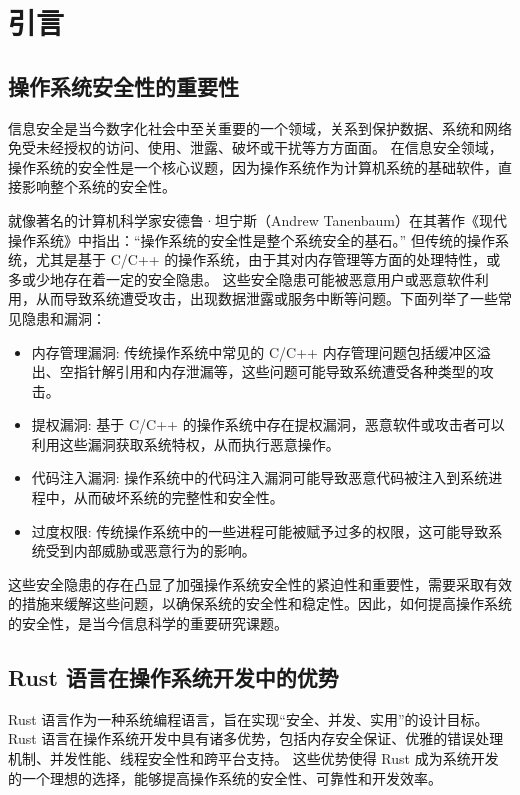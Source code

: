 
\chapter{引言}

\section{操作系统安全性的重要性}
信息安全是当今数字化社会中至关重要的一个领域，关系到保护数据、系统和网络免受未经授权的访问、使用、泄露、破坏或干扰等方方面面。\parencite{anderson2001,stallings2017,schneier2015,bishop2003,ross2014}
在信息安全领域，操作系统的安全性是一个核心议题，因为操作系统作为计算机系统的基础软件，直接影响整个系统的安全性。\parencite{zhang2020enhancing,wang2019survey,patel2018mitigating}

就像著名的计算机科学家安德鲁·坦宁斯（Andrew Tanenbaum）在其著作《现代操作系统》\parencite{tanenbaum2014modern}中指出：“操作系统的安全性是整个系统安全的基石。” 
但传统的操作系统，尤其是基于 C/C++ 的操作系统，由于其对内存管理等方面的处理特性，或多或少地存在着一定的安全隐患。
这些安全隐患可能被恶意用户或恶意软件利用，从而导致系统遭受攻击，出现数据泄露或服务中断等问题。下面列举了一些常见隐患和漏洞：
\begin{itemize}
    \item 内存管理漏洞: 传统操作系统中常见的 C/C++ 内存管理问题包括缓冲区溢出、空指针解引用和内存泄漏等，这些问题可能导致系统遭受各种类型的攻击。\parencite{example1}
    \item 提权漏洞: 基于 C/C++ 的操作系统中存在提权漏洞，恶意软件或攻击者可以利用这些漏洞获取系统特权，从而执行恶意操作。\parencite{example2}
    \item 代码注入漏洞: 操作系统中的代码注入漏洞可能导致恶意代码被注入到系统进程中，从而破坏系统的完整性和安全性。\parencite{example3}
    \item 过度权限: 传统操作系统中的一些进程可能被赋予过多的权限，这可能导致系统受到内部威胁或恶意行为的影响。\parencite{example4}
\end{itemize}

这些安全隐患的存在凸显了加强操作系统安全性的紧迫性和重要性，需要采取有效的措施来缓解这些问题，以确保系统的安全性和稳定性。因此，如何提高操作系统的安全性，是当今信息科学的重要研究课题。

\section{Rust 语言在操作系统开发中的优势}
Rust 语言\parencite{matsakis2014rust}作为一种系统编程语言，旨在实现“安全、并发、实用”的设计目标。
Rust 语言在操作系统开发中具有诸多优势，包括内存安全保证、优雅的错误处理机制、并发性能、线程安全性和跨平台支持。
这些优势使得 Rust 成为系统开发的一个理想的选择，能够提高操作系统的安全性、可靠性和开发效率。

